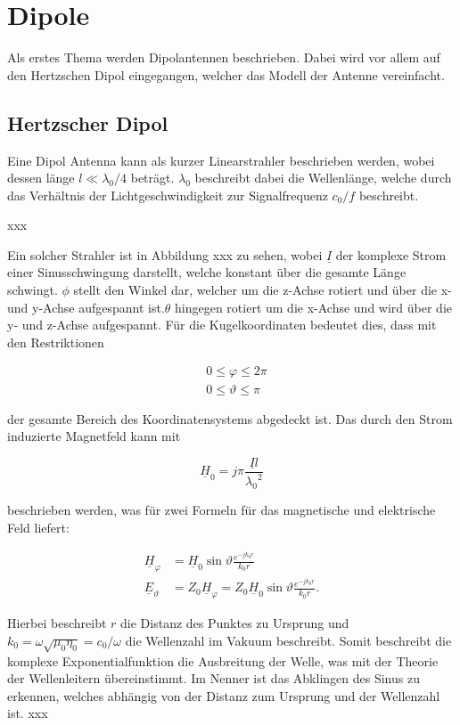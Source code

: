 \section{Dipole}

Als erstes Thema werden Dipolantennen beschrieben. Dabei wird vor allem auf den Hertzschen Dipol eingegangen, welcher das Modell der Antenne vereinfacht.

\subsection{Hertzscher Dipol}

Eine Dipol Antenna kann als kurzer Linearstrahler beschrieben werden, wobei dessen länge $l \ll \lambda_0 /4$ beträgt. $\lambda_0$ beschreibt dabei die Wellenlänge, welche durch das Verhältnis der Lichtgeschwindigkeit zur Signalfrequenz $c_0/f$ beschreibt. 

xxx

Ein solcher Strahler ist in Abbildung xxx zu sehen, wobei $\underline{I}$ der komplexe Strom einer Sinusschwingung darstellt, welche konstant über die gesamte Länge schwingt. $\phi$ stellt den Winkel dar, welcher um die z-Achse rotiert und über die x- und y-Achse aufgespannt ist.$\theta$ hingegen rotiert um die x-Achse und wird über die y- und z-Achse aufgespannt. Für die Kugelkoordinaten bedeutet dies, dass mit den Restriktionen 

\begin{align}
&0 \leq \varphi \leq 2\pi\\
&0 \leq \vartheta \leq \pi
\end{align}

der gesamte Bereich des Koordinatensystems abgedeckt ist. Das durch den Strom induzierte Magnetfeld kann mit 

\begin{equation}
\underline{H}_0 = j\pi \frac{\underline{I}l}{{\lambda_0}^2}
\end{equation}

beschrieben werden, was für zwei Formeln für das magnetische und elektrische Feld liefert:

\begin{align}
\underline{H}_\varphi   &= \underline{H}_0 \sin \vartheta \frac{e^{-jk_0r}}{k_0r}\\
\underline{E}_\vartheta &= Z_0 \underline{H}_\varphi = Z_0 \underline{H}_0 \sin \vartheta \frac{e^{-jk_0r}}{k_0r}.
\end{align}

Hierbei beschreibt $r$ die Distanz des Punktes zu Ursprung und $k_0 = \omega \sqrt{\mu_0 \eta_0} = c_0/\omega$ die Wellenzahl im Vakuum beschreibt. Somit beschreibt die komplexe Exponentialfunktion die Ausbreitung der Welle, was mit der Theorie der Wellenleitern übereinstimmt. Im Nenner ist das Abklingen des Sinus zu erkennen, welches abhängig von der Distanz zum Ursprung und der Wellenzahl ist. xxx


